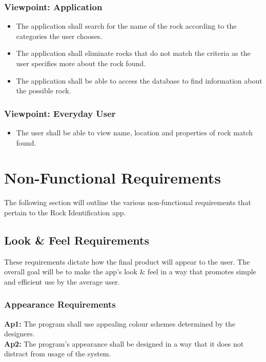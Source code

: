 \documentclass[titlepage]{article}
\begin{document}
\subsubsection{Viewpoint: Application}
\begin{itemize}

  \item The application shall search for the name of the rock according to the categories the user chooses.
  \item The application shall eliminate rocks that do not match the criteria as the user specifies more about the rock found. 
  \item The application shall be able to access the database to find information about the possible rock. 
  \end{itemize}
    \subsubsection{Viewpoint: Everyday User}
  \begin{itemize}
  \item The user shall be able to view name, location and properties of rock match found. 
\end{itemize}


\section{Non-Functional Requirements}

The following section will outline the various non-functional requirements that pertain to the Rock Identification app.

\subsection{Look \& Feel Requirements}
These requirements dictate how the final product will appear to the user. The overall goal will be to make the app's look \& feel in a way that promotes simple and efficient use by the average user.
\subsubsection{Appearance Requirements}
\textbf{Ap1:} The program shall use appealing colour schemes determined by the designers.\\

\noindent\textbf{Ap2:} The program's appearance shall be designed in a way that it does not distract from usage of the system.\\
\end{document}
